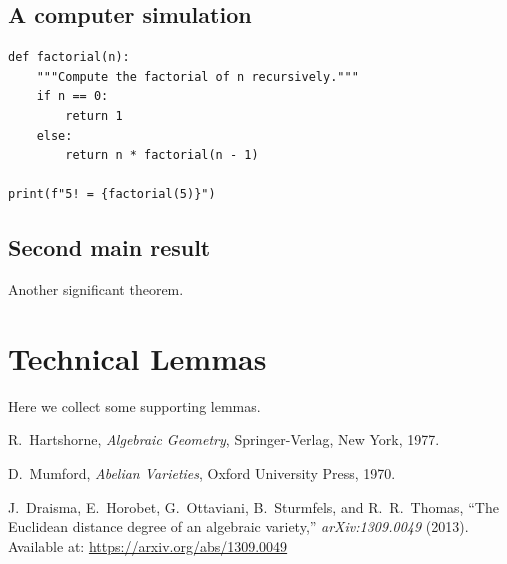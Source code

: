 \documentclass[12pt,reqno,oneside]{amsbook}
\theoremstyle{definition}
\begin{document}
\section{A computer simulation}



\begin{lstlisting}[basicstyle = \singlespacing\ttfamily\small,resetmargins=true,tabsize=5,extendedchars=false]
def factorial(n):
    """Compute the factorial of n recursively."""
    if n == 0:
        return 1
    else:
        return n * factorial(n - 1)

print(f"5! = {factorial(5)}")
\end{lstlisting}



\section{Second main result}
Another significant theorem.

\appendix
\chapter{Technical Lemmas}
Here we collect some supporting lemmas.

\backmatter 
\singlespacing

\begin{thebibliography}{9}


R.~Hartshorne, \emph{Algebraic Geometry}, Springer-Verlag, New York, 1977.

D.~Mumford, \emph{Abelian Varieties}, Oxford University Press, 1970.

J.~Draisma, E.~Horobet, G.~Ottaviani, B.~Sturmfels, and R.~R.~Thomas, 
``The Euclidean distance degree of an algebraic variety,'' 
\emph{arXiv:1309.0049} (2013).  
Available at: \href{https://arxiv.org/abs/1309.0049}{https://arxiv.org/abs/1309.0049}

\end{thebibliography}
\end{document}
